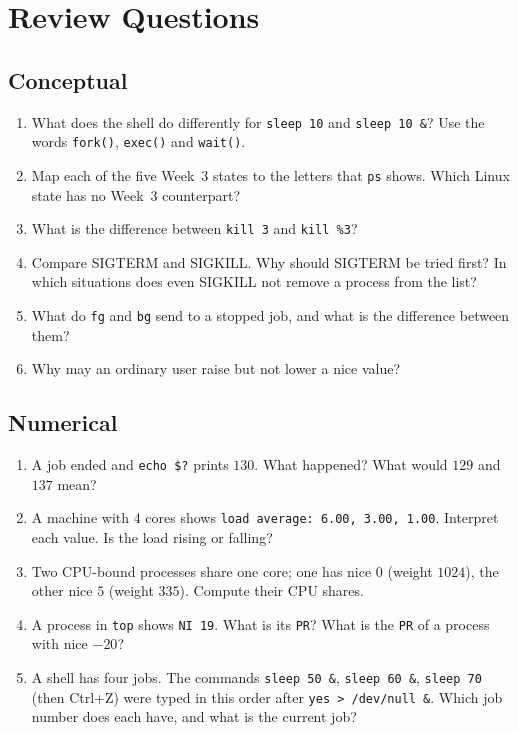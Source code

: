 \documentclass[11pt,a4paper]{article}
\newcommand{\cmd}[1]{\texttt{#1}}
\begin{document}
\section{Review Questions}

\subsection*{Conceptual}
\begin{enumerate}[leftmargin=1.6em]
  \item What does the shell do differently for \cmd{sleep 10} and \cmd{sleep 10 \&}? Use the words \cmd{fork()}, \cmd{exec()} and \cmd{wait()}.
  \item Map each of the five Week~3 states to the letters that \cmd{ps} shows. Which Linux state has no Week~3 counterpart?
  \item What is the difference between \cmd{kill 3} and \cmd{kill \%3}?
  \item Compare SIGTERM and SIGKILL. Why should SIGTERM be tried first? In which situations does even SIGKILL not remove a process from the list?
  \item What do \cmd{fg} and \cmd{bg} send to a stopped job, and what is the difference between them?
  \item Why may an ordinary user raise but not lower a nice value?
\end{enumerate}

\subsection*{Numerical}
\begin{enumerate}[leftmargin=1.6em,resume]
  \item A job ended and \verb|echo $?| prints $130$. What happened? What would $129$ and $137$ mean?
  \item A machine with $4$ cores shows \texttt{load average: 6.00, 3.00, 1.00}. Interpret each value. Is the load rising or falling?
  \item Two CPU-bound processes share one core; one has nice $0$ (weight $1024$), the other nice $5$ (weight $335$). Compute their CPU shares.
  \item A process in \cmd{top} shows \texttt{NI 19}. What is its \texttt{PR}? What is the \texttt{PR} of a process with nice $-20$?
  \item A shell has four jobs. The commands \cmd{sleep 50 \&}, \cmd{sleep 60 \&}, \cmd{sleep 70} (then Ctrl+Z) were typed in this order after \cmd{yes > /dev/null \&}. Which job number does each have, and what is the current job?
\end{enumerate}
\end{document}
